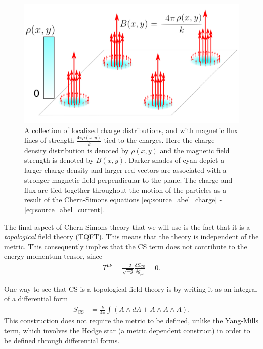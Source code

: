 \begin{figure}[htb]
	\centering
		\includegraphics[scale=0.17]{Background_Folder/figures/Flux_Attachment_2.pdf}
    \caption[This figure depicts magnetic flux attachment.]{A collection of localized charge distributions, and with magnetic flux lines of strength $\frac{4 \pi \rho(x,y)}{k}$ tied to the charges. Here the charge density distribution is denoted by $\rho(x,y)$ and the magnetic field strength is denoted by $B(x,y)$. Darker shades of cyan depict a larger charge density and larger red vectors are associated with a stronger magnetic field perpendicular to the plane.  The charge and flux are tied together throughout the motion of the particles as a result of the Chern-Simons equations \eqref{eq:source_abel_charge} - \eqref{eq:source_abel_current}.} \label{fig:flux_attachment}
\end{figure}

The final aspect of Chern-Simons theory that we will use is the fact that it is a \textit{topological} field theory (TQFT). This means that the theory is independent of the metric. This consequently implies that the CS term does not contribute to the energy-momentum tensor, since
\begin{align}
    T^{\mu \nu} = \frac{-2}{ \sqrt{-g}} \frac{\delta S_{\text{CS}}}{ \delta g_{\mu\nu}} =0.
\end{align}

One way to see that CS is a topological field theory is by writing it as an integral of a differential form
\begin{align}
    S_{\text{CS}} &= \frac{k}{4 \pi} \int \left(A \wedge dA +A \wedge A \wedge A\right).
\end{align}
This construction does not require the metric to be defined, unlike the Yang-Mills term, which involves the Hodge star (a metric dependent construct) in order to be defined through differential forms.

